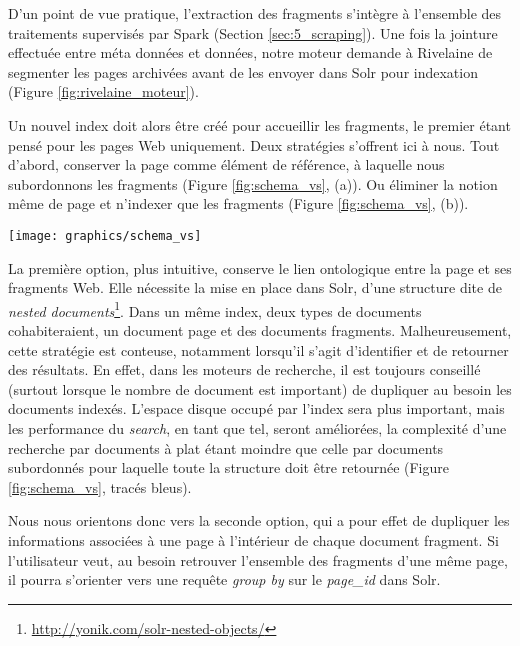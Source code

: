 \documentclass[symmetric,justified,marginals=raggedouter]{tufte-book}
\begin{document}
\noindent D'un point de vue pratique, l'extraction des fragments s'intègre à l'ensemble des traitements supervisés par Spark (Section \ref{sec:5_scraping}). Une fois la jointure effectuée entre méta données et données, notre moteur demande à Rivelaine de segmenter les pages archivées avant de les envoyer dans Solr pour indexation (Figure \ref{fig:rivelaine_moteur}).

Un nouvel index doit alors être créé pour accueillir les fragments, le premier étant pensé pour les pages Web uniquement. Deux stratégies s'offrent ici à nous. Tout d'abord, conserver la page comme élément de référence, à laquelle nous subordonnons les fragments (Figure \ref{fig:schema_vs}, (a)). Ou éliminer la notion même de page et n'indexer que les fragments (Figure \ref{fig:schema_vs}, (b)). 

\begin{figure*}%
  \texttt{[image: graphics/schema\_vs]}
  \caption{Différentes stratégies d'indexation du fragment Web dans un moteur de recherche et complexité de la recherche (bleu)}
  \label{fig:schema_vs}
\end{figure*} 

\noindent La première option, plus intuitive, conserve le lien ontologique entre la page et ses fragments Web. Elle nécessite la mise en place dans Solr, d'une structure dite de \textit{nested documents}\footnote{\url{http://yonik.com/solr-nested-objects/}}. Dans un même index, deux types de documents cohabiteraient, un document page et des documents fragments. Malheureusement, cette stratégie est conteuse, notamment lorsqu'il s'agit d'identifier et de retourner des résultats. En effet, dans les moteurs de recherche, il est toujours conseillé (surtout lorsque le nombre de document est important) de dupliquer au besoin les documents indexés. L'espace disque occupé par l'index sera plus important, mais les performance du \textit{search}, en tant que tel, seront améliorées, la complexité d'une recherche par documents à plat étant moindre que celle par documents subordonnés pour laquelle toute la structure doit être retournée (Figure  \ref{fig:schema_vs}, tracés bleus). 

Nous nous orientons donc vers la seconde option, qui a pour effet de dupliquer les informations associées à une page à l'intérieur de chaque document fragment. Si l'utilisateur veut, au besoin retrouver l'ensemble des fragments d'une même page, il pourra s'orienter vers une requête \textit{group by} sur le \textit{page\_id} dans Solr. 
\end{document}
